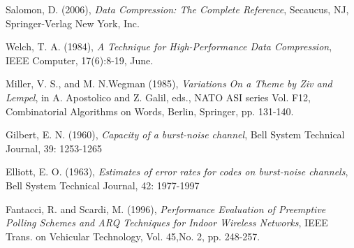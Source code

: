 \documentclass[a4paper,11pt]{article}
\theoremstyle{definition}
\begin{document}
\cleardoublepage
\begin{thebibliography}{9}
	Salomon, D. (2006), \emph{Data Compression: The Complete Reference}, Secaucus, NJ, Springer-Verlag New York, Inc.

	Welch, T. A. (1984), 
	\emph{A Technique for High-Performance Data Compression}, IEEE Computer, 17(6):8-19, June.
	
	Miller, V. S., and M. N.Wegman (1985),
	\emph{Variations On a Theme by Ziv and Lempel},
	in A. Apostolico and Z. Galil, eds., NATO ASI series Vol. F12, Combinatorial Algorithms on Words, Berlin, Springer, pp. 131-140.
	
	 Gilbert, E. N. (1960), \emph{Capacity of a burst-noise channel}, Bell System Technical Journal, 39: 1253-1265
	 
	 Elliott, E. O. (1963), \emph{Estimates of error rates for codes on burst-noise channels}, Bell System Technical Journal, 42: 1977-1997
	 
	 Fantacci, R. and Scardi, M. (1996), \emph{Performance Evaluation of Preemptive Polling Schemes and ARQ Techniques for Indoor Wireless Networks}, IEEE Trans. on Vehicular Technology, Vol. 45,No. 2, pp. 248-257.
	 
\end{thebibliography}
\end{document}
